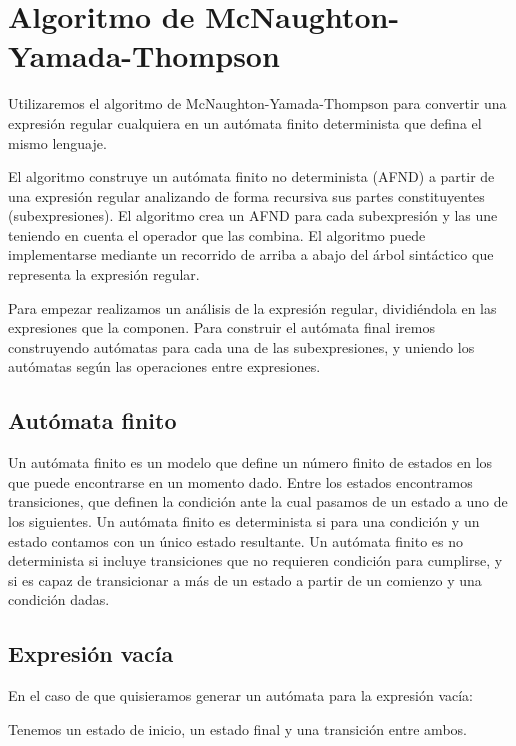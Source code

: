 
\section{Algoritmo de McNaughton-Yamada-Thompson}

Utilizaremos el algoritmo de McNaughton-Yamada-Thompson \cite{5221603, Thompson:1968:PTR:363347.363387} para convertir una expresión regular cualquiera en un autómata finito determinista que defina el mismo lenguaje.

El algoritmo construye un autómata finito no determinista (AFND) a partir de una expresión regular analizando de forma recursiva sus partes constituyentes (subexpresiones).
El algoritmo crea un AFND para cada subexpresión y las une teniendo en cuenta el operador que las combina.
El algoritmo puede implementarse mediante un recorrido de arriba a abajo del árbol sintáctico que representa la expresión regular.

Para empezar realizamos un análisis de la expresión regular, dividiéndola en las expresiones que la componen.
Para construir el autómata final iremos construyendo autómatas para cada una de las subexpresiones, y uniendo los autómatas según las operaciones entre expresiones.

\subsection{Autómata finito}
Un autómata finito es un modelo que define un número finito de estados en los que puede encontrarse en un momento dado.
Entre los estados encontramos transiciones, que definen la condición ante la cual pasamos de un estado a uno de los siguientes.
Un autómata finito es determinista si para una condición y un estado contamos con un único estado resultante.
Un autómata finito es no determinista si incluye transiciones que no requieren condición para cumplirse, y si es capaz de transicionar a más de un estado a partir de un comienzo y una condición dadas.

\subsection{Expresión vacía}
En el caso de que quisieramos generar un autómata para la expresión vacía:


Tenemos un estado de inicio, un estado final y una transición entre ambos.

